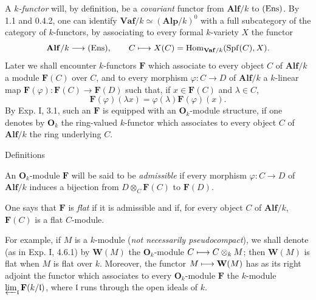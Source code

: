 A \emph{$k$-functor} will, by definition, be a \emph{covariant} functor from $\mathbf{Alf}/k$ to $\textup{(Ens)}$. By 1.1 and 0.4.2, one can identify $\mathbf{Vaf}/k\simeq(\mathbf{Alp}/k)^0$ with a full subcategory of the category of $k$-functors, by associating to every formal $k$-variety $X$ the functor
\[
\mathbf{Alf}/k\longrightarrow\textup{(Ens)},\qquad C\longmapsto X(C)=\operatorname{Hom}_{\mathbf{Vaf}/k}(\operatorname{Spf}(C),X).
\]
Later we shall encounter $k$-functors $\mathbf F$ which associate to every object $C$ of $\mathbf{Alf}/k$ a module $\mathbf F(C)$ over $C$, and to every morphism $\varphi:C\to D$ of $\mathbf{Alf}/k$ a $k$-linear map $\mathbf F(\varphi):\mathbf F(C)\to\mathbf F(D)$ such that, if $x\in\mathbf F(C)$ and $\lambda\in C$,
\[
\mathbf F(\varphi)(\lambda x)=\varphi(\lambda)\mathbf F(\varphi)(x).
\]
By Exp. I, 3.1, such an $\mathbf F$ is equipped with an $\mathbf O_k$-module structure, if one denotes by $\mathbf O_k$ the ring-valued $k$-functor which associates to every object $C$ of $\mathbf{Alf}/k$ the ring underlying $C$.
\begin{enoncerm}{Definitions}{}
\begin{enumeratei}
\item An $\mathbf O_k$-module $\mathbf F$ will be said to be \emph{admissible} if every morphism $\varphi:C\to D$ of $\mathbf{Alf}/k$ induces a bijection from $D\otimes_C\mathbf F(C)$ to $\mathbf F(D)$.
\item One says that $\mathbf F$ is \emph{flat} if it is admissible and if, for every object $C$ of $\mathbf{Alf}/k$, $\mathbf F(C)$ is a flat $C$-module.
\end{enumeratei}
\end{enoncerm}
For example, if $M$ is a $k$-module (\emph{not necessarily pseudocompact}), we shall denote (as in Exp. I, 4.6.1) by $\mathbf W(M)$ the $\mathbf O_k$-module $C\longmapsto C\otimes_k M$; then $\mathbf W(M)$ is flat when $M$ is flat over $k$.
Moreover, the functor $M\longmapsto\mathbf W(M)$ has as its right adjoint the functor which associates to every $\mathbf O_k$-module $\mathbf F$ the $k$-module $\varprojlim_{\mathfrak l}\mathbf F(k/\mathfrak l)$, where $\mathfrak l$ runs through the open ideals of $k$.

